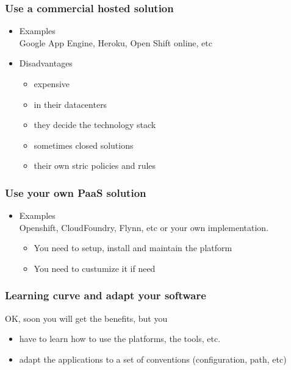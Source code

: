 \documentclass[bigger]{beamer}
\begin{document}
\begin{frame}
\frametitle{Use a commercial hosted solution}
\label{sec-1-7}
\begin{itemize}

\item Examples\\
\label{sec-1-7-1}%
Google App Engine, Heroku, Open Shift online, etc


\item Disadvantages\\
\label{sec-1-7-2}%
\begin{itemize}
\item expensive
\item in their datacenters
\item they decide the technology stack
\item sometimes closed solutions
\item their own stric policies and rules
\end{itemize}

\end{itemize} %
\end{frame}
\begin{frame}
\frametitle{Use your own PaaS solution}
\label{sec-1-8}
\begin{itemize}

\item Examples\\
\label{sec-1-8-1}%
Openshift, CloudFoundry, Flynn, etc or your own implementation.

\begin{itemize}
\item You need to setup, install and maintain the platform
\item You need to custumize it if need
\end{itemize}
  
\end{itemize} %
\end{frame}
\begin{frame}
\frametitle{Learning curve and adapt your software}
\label{sec-1-9}


OK, soon you will get the benefits, but you 

\begin{itemize}
\item have to learn how to use the platforms, the tools, etc.
\item adapt the applications to a set of conventions (configuration, path, etc)
\end{itemize}
\end{frame}
\end{document}

